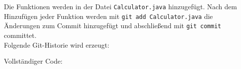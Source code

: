Die Funktionen werden in der Datei \texttt{Calculator.java} hinzugefügt.
Nach dem Hinzufügen jeder Funktion werden mit \lstinline|git add Calculator.java| die Änderungen zum Commit hinzugefügt und abschließend mit \lstinline|git commit| committet.\\

Folgende Git-Historie wird erzeugt:


Vollständiger Code:

